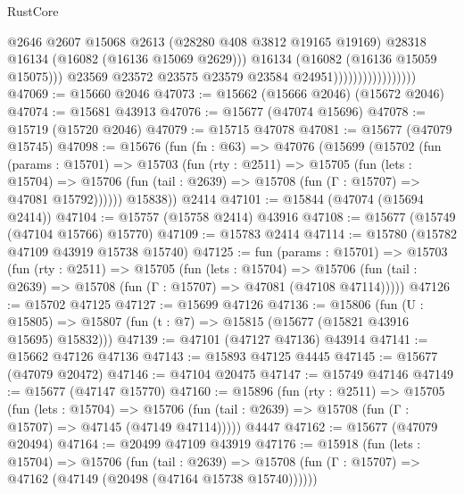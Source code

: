 \begin{lexlean}{RustCore}
\begin{coremodule}
                                          @2646
                                          @2607
                                          @15068
                                          @2613
                                          (@28280 @408 @3812 @19165 @19169)
                                          @28318
                                          @16134
                                          (@16082 (@16136 @15069 @2629)))
                                        @16134
                                        (@16082 (@16136 @15059 @15075)))
                                      @23569
                                      @23572
                                      @23575
                                      @23579
                                      @23584
                                      @24951)))))))))))))))))
@47069 := @15660 @2046
@47073 := @15662 (@15666 @2046) (@15672 @2046)
@47074 := @15681 @43913
@47076 := @15677 (@47074 @15696)
@47078 := @15719 (@15720 @2046)
@47079 := @15715 @47078
@47081 := @15677 (@47079 @15745)
@47098 := @15676
    (fun (fn : @63) =>
    @47076
      (@15699
        (@15702
          (fun (params : @15701) =>
          @15703
            (fun (rty : @2511) =>
            @15705
              (fun (lets : @15704) =>
              @15706 (fun (tail : @2639) => @15708 (fun (Γ : @15707) => @47081 @15792))))))
        @15838))
    @2414
@47101 := @15844 (@47074 (@15694 @2414))
@47104 := @15757 (@15758 @2414) @43916
@47108 := @15677 (@15749 (@47104 @15766) @15770)
@47109 := @15783 @2414
@47114 := @15780 (@15782 @47109 @43919 @15738 @15740)
@47125 := fun (params : @15701) =>
  @15703
    (fun (rty : @2511) =>
    @15705
      (fun (lets : @15704) =>
      @15706 (fun (tail : @2639) => @15708 (fun (Γ : @15707) => @47081 (@47108 @47114)))))
@47126 := @15702 @47125
@47127 := @15699 @47126
@47136 := @15806
    (fun (U : @15805) => @15807 (fun (t : @7) => @15815 (@15677 (@15821 @43916 @15695) @15832)))
@47139 := @47101 (@47127 @47136) @43914
@47141 := @15662 @47126 @47136
@47143 := @15893 @47125 @4445
@47145 := @15677 (@47079 @20472)
@47146 := @47104 @20475
@47147 := @15749 @47146
@47149 := @15677 (@47147 @15770)
@47160 := @15896
    (fun (rty : @2511) =>
    @15705
      (fun (lets : @15704) =>
      @15706 (fun (tail : @2639) => @15708 (fun (Γ : @15707) => @47145 (@47149 @47114)))))
    @4447
@47162 := @15677 (@47079 @20494)
@47164 := @20499 @47109 @43919
@47176 := @15918
    (fun (lets : @15704) =>
    @15706
      (fun (tail : @2639) =>
      @15708 (fun (Γ : @15707) => @47162 (@47149 (@20498 (@47164 @15738 @15740))))))

\end{coremodule}
\end{lexlean}
